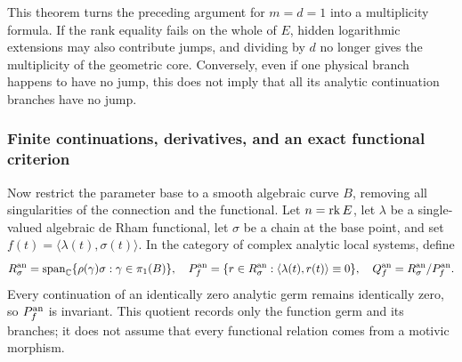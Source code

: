 \documentclass[11pt,a4paper,oneside]{article}
\theoremstyle{plain}
\theoremstyle{definition}
\theoremstyle{remark}
\numberwithin{equation}{section}
\begin{document}
This theorem turns the preceding argument for $m=d=1$ into a multiplicity formula.
If the rank equality fails on the whole of $E$, hidden logarithmic extensions may also contribute jumps,
and dividing by $d$ no longer gives the multiplicity of the geometric core. Conversely, even if one physical branch happens to have no jump,
this does not imply that all its analytic continuation branches have no jump.

\subsubsection{Finite continuations, derivatives, and an exact functional criterion}
Now restrict the parameter base to a smooth algebraic curve $B$, removing all singularities of the connection and the functional.
Let $n=\operatorname{rk} E$, let $\lambda$ be a single-valued algebraic de Rham functional,
let $\sigma$ be a chain at the base point, and set $f(t)=\langle\lambda(t),\sigma(t)\rangle$.
In the category of complex analytic local systems, define
\[
 R_\sigma^{\rm an}
   =\operatorname{span}_{\mathbb C}\{\rho(\gamma)\sigma:\gamma\in\pi_1(B)\},
 \quad
 P_f^{\rm an}
   =\{r\in R_\sigma^{\rm an}:
               \langle\lambda(t),r(t)\rangle\equiv0\},
 \quad Q_f^{\rm an}=R_\sigma^{\rm an}/P_f^{\rm an}.
\]
Every continuation of an identically zero analytic germ remains identically zero, so $P_f^{\rm an}$ is invariant.
This quotient records only the function germ and its branches; it does not assume that every functional relation comes from a motivic morphism.
\end{document}
